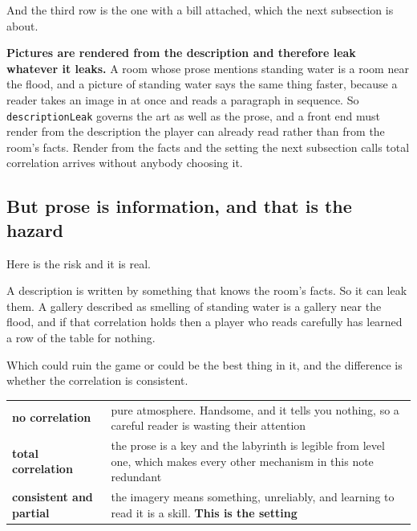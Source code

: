 \documentclass[11pt,a4paper]{article}
\begin{document}
And the third row is the one with a bill attached, which the next subsection is about.

\begin{alarmbox}
\textbf{Pictures are rendered from the description and therefore leak whatever it leaks.} A room
whose prose mentions standing water is a room near the flood, and a picture of standing water says
the same thing faster, because a reader takes an image in at once and reads a paragraph in
sequence. So \texttt{descriptionLeak} governs the art as well as the prose, and a front end must
render from the description the player can already read rather than from the room's facts. Render
from the facts and the setting the next subsection calls total correlation arrives without anybody
choosing it.
\end{alarmbox}

\subsection{But prose is information, and that is the hazard}

Here is the risk and it is real.

A description is written by something that knows the room's facts. So it can leak them. A gallery
described as smelling of standing water is a gallery near the flood, and if that correlation holds
then a player who reads carefully has learned a row of the table for nothing.

Which could ruin the game or could be the best thing in it, and the difference is whether the
correlation is consistent.

\begin{center}
\begin{tabular}{@{}l@{\hspace{4mm}}>{\raggedright\arraybackslash}p{}@{}}
\toprule
\textbf{no correlation} & pure atmosphere. Handsome, and it tells you nothing, so a careful reader
is wasting their attention \\[1mm]
\textbf{total correlation} & the prose is a key and the labyrinth is legible from level one, which
makes every other mechanism in this note redundant \\[1mm]
\textbf{consistent and partial} & the imagery means something, unreliably, and learning to read it is
a skill. \textbf{This is the setting} \\
\bottomrule
\end{tabular}
\end{center}
\end{document}
